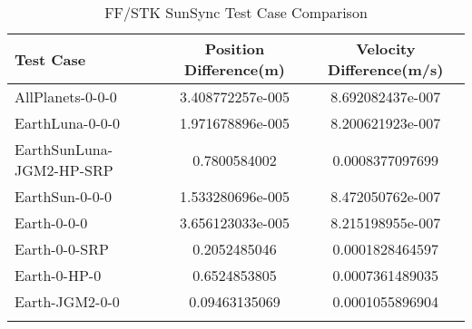 \begin{table}[htbp!]
\centering
\caption{ FF/STK SunSync Test Case Comparison}
      \begin{tabular}{lcc}
      \hline\hline
          Test Case & Position Difference(m) & Velocity Difference(m/s) \\
         \hline
         AllPlanets-0-0-0 & 3.408772257e-005 & 8.692082437e-007 \\
         EarthLuna-0-0-0 & 1.971678896e-005 & 8.200621923e-007 \\
         EarthSunLuna-JGM2-HP-SRP & 0.7800584002 & 0.0008377097699 \\
         EarthSun-0-0-0 & 1.533280696e-005 & 8.472050762e-007 \\
         Earth-0-0-0 & 3.656123033e-005 & 8.215198955e-007 \\
         Earth-0-0-SRP & 0.2052485046 & 0.0001828464597 \\
         Earth-0-HP-0 & 0.6524853805 & 0.0007361489035 \\
         Earth-JGM2-0-0 & 0.09463135069 & 0.0001055896904 \\
      \hline\hline
      \label{Table: SunSync FF-STK Table} 
\end{tabular}
\end{table}
